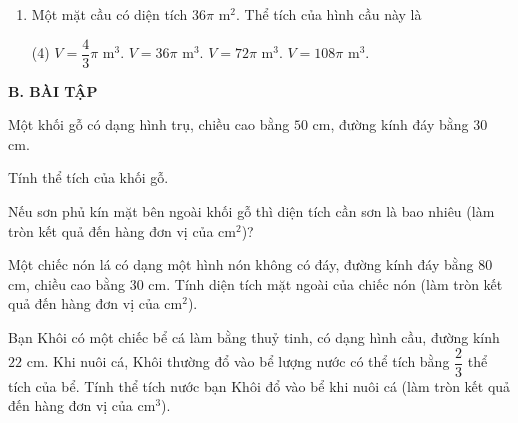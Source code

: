 \begin{practice}
\begin{enumerate}
        \item Một mặt cầu có diện tích $36\pi$ m$^2$. Thể tích của hình cầu này là
        \begin{tasks}(4)
            \task $V=\dfrac{4}{3}\pi$ m$^3$.
            \task $V=36\pi$ m$^3$.
            \task $V=72\pi$ m$^3$.
            \task $V=108\pi$ m$^3$.
        \end{tasks}
        \par\noindent\answerbox\par
    \end{enumerate}

    \textbf{B. BÀI TẬP}

    \begin{questions}[resume=SBT]
        \item Một khối gỗ có dạng hình trụ, chiều cao bằng $50$ cm, đường kính đáy bằng $30$ cm.
        \begin{questions}
            \item Tính thể tích của khối gỗ.
            \item Nếu sơn phủ kín mặt bên ngoài khối gỗ thì diện tích cần sơn là bao nhiêu (làm tròn kết quả đến hàng đơn vị của cm$^2$)?
        \end{questions}
        \answerline
        \answerline

        \item Một chiếc nón lá có dạng một hình nón không có đáy, đường kính đáy bằng $80$ cm, chiều cao bằng $30$ cm. Tính diện tích mặt ngoài của chiếc nón (làm tròn kết quả đến hàng đơn vị của cm$^2$).
        \answerline
        \answerline

        \item Bạn Khôi có một chiếc bể cá làm bằng thuỷ tinh, có dạng hình cầu, đường kính $22$ cm. Khi nuôi cá, Khôi thường đổ vào bể lượng nước có thể tích bằng $\dfrac{2}{3}$ thể tích của bể. Tính thể tích nước bạn Khôi đổ vào bể khi nuôi cá (làm tròn kết quả đến hàng đơn vị của cm$^3$).

        \begin{center}
        \end{center}
        \answerline
        \answerline


\end{questions}
\end{practice}
